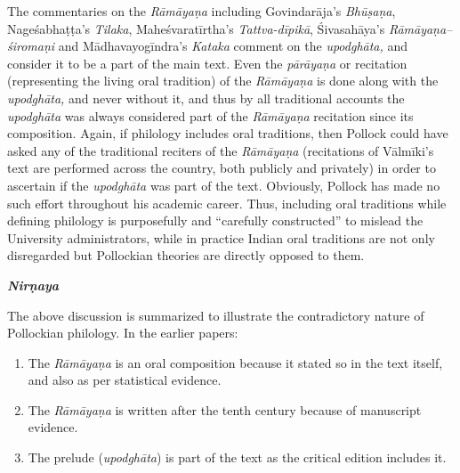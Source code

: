 The commentaries on the\textit{ Rāmāyaṇa} including Govindarāja’s \textit{Bhūṣaṇa}, Nageśabhaṭṭa’s \textit{Tilaka}, Maheśvaratīrtha’s \textit{Tattva-dīpikā}, Śivasahāya’s \textit{Rāmāyaṇa–śiromaṇi} and Mādhavayogīndra’s \textit{Kataka} comment on the \textit{upodghāta, }and consider it to be a part of the main text. Even the \textit{pārāyaṇa} or recitation (representing the living oral tradition) of the \textit{Rāmāyaṇa} is done along with the \textit{upodghāta, }and never without it, and thus by all traditional accounts the \textit{upodghāta }was always considered part of the \textit{Rāmāyaṇa }recitation since its composition. Again, if philology includes oral traditions, then Pollock could have asked any of the traditional reciters of the \textit{Rāmāyaṇa }(recitations of Vālmīki’s text are performed across the country, both publicly and privately) in order to ascertain if the\textit{ upodghāta }was part of the text. Obviously, Pollock has made no such effort throughout his academic career. Thus, including oral traditions while defining philology is purposefully and “carefully constructed” to mislead the University administrators, while in practice Indian oral traditions are not only disregarded but Pollockian theories are directly opposed to them.

\textit{\textbf{Nirṇaya}}

The above discussion is summarized to illustrate the contradictory nature of Pollockian philology. In the earlier papers:

\begin{enumerate}
\itemsep=0pt
\item The \textit{Rāmāyaṇa} is an oral composition because it stated so in the text itself, and also as per statistical evidence.

 \item The \textit{Rāmāyaṇa }is written after the tenth century because of manuscript evidence.

 \item The prelude (\textit{upodghāta}) is part of the text as the critical edition includes it.

\end{enumerate}

